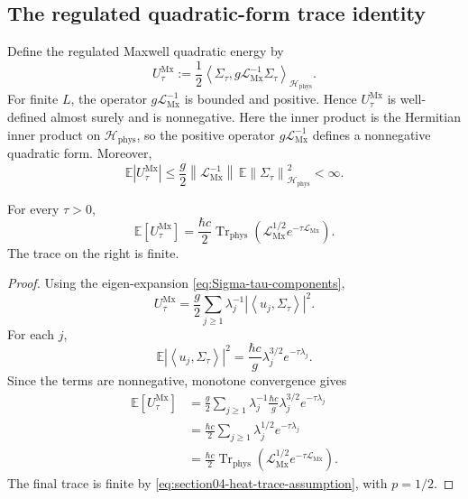 \documentclass[11pt]{article}
\providecommand{\hbarc}{\hbar c}
\providecommand{\E}{\mathbb{E}}
\providecommand{\Trphys}{\operatorname{Tr}_{\mathrm{phys}}}
\providecommand{\abs}[1]{\left\lvert #1\right\rvert}
\providecommand{\norm}[1]{\left\lVert #1\right\rVert}
\providecommand{\inner}[2]{\left\langle #1,#2\right\rangle}
\providecommand{\paren}[1]{\left(#1\right)}
\providecommand{\Hphys}{\mathcal H_{\mathrm{phys}}}
\providecommand{\LMx}{\mathcal L_{\mathrm{Mx}}}
\providecommand{\Sigmatau}{\Sigma_{\tau}}
\providecommand{\UtauMx}{U_{\tau}^{\mathrm{Mx}}}
\numberwithin{equation}{section}
\begin{document}
\subsection{The regulated quadratic-form trace identity}
\label{subsec:regulated-maxwell-trace-identity}

Define the regulated Maxwell quadratic energy by
\begin{equation}
    \boxed{
    \UtauMx
    :=
    \frac12
    \inner{\Sigmatau}{g\LMx^{-1}\Sigmatau}_{\Hphys} .
    }
    \label{eq:Utau-Mx-def-section04}
\end{equation}
For finite \(L\), the operator \(g\LMx^{-1}\) is bounded and positive.  Hence
\(\UtauMx\) is well-defined almost surely and is nonnegative.  Here the inner
product is the Hermitian inner product on \(\Hphys\), so the positive operator
\(g\LMx^{-1}\) defines a nonnegative quadratic form.  Moreover,
\[
    \E\abs{\UtauMx}
    \leq
    \frac{g}{2}\norm{\LMx^{-1}}\,
    \E\norm{\Sigmatau}_{\Hphys}^2
    <\infty .
\]

\begin{theorem}
\label{thm:regulated-maxwell-quadratic-trace}
For every \(\tau>0\),
\begin{equation}
    \boxed{
    \E[\UtauMx]
    =
    \frac{\hbarc}{2}
    \Trphys\paren{\LMx^{1/2}e^{-\tau\LMx}} .
    }
    \label{eq:regulated-maxwell-trace-identity}
\end{equation}
The trace on the right is finite.
\end{theorem}

\begin{proof}
Using the eigen-expansion \eqref{eq:Sigma-tau-components},
\[
    \UtauMx
    =
    \frac{g}{2}
    \sum_{j\geq1}\lambda_j^{-1}
    \abs{\inner{u_j}{\Sigmatau}}^2 .
\]
For each \(j\),
\[
    \E\abs{\inner{u_j}{\Sigmatau}}^2
    =
    \frac{\hbarc}{g}\lambda_j^{3/2}e^{-\tau\lambda_j} .
\]
Since the terms are nonnegative, monotone convergence gives
\begin{align*}
    \E[\UtauMx]
    &=
    \frac{g}{2}
    \sum_{j\geq1}\lambda_j^{-1}
    \frac{\hbarc}{g}\lambda_j^{3/2}e^{-\tau\lambda_j} \\
    &=
    \frac{\hbarc}{2}
    \sum_{j\geq1}\lambda_j^{1/2}e^{-\tau\lambda_j}       \\
    &=
    \frac{\hbarc}{2}
    \Trphys\paren{\LMx^{1/2}e^{-\tau\LMx}} .
\end{align*}
The final trace is finite by \eqref{eq:section04-heat-trace-assumption}, with
\(p=1/2\).
\end{proof}
\end{document}
